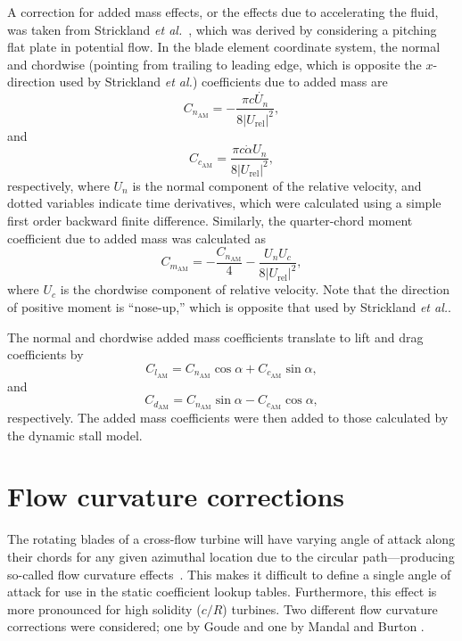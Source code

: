 A correction for added mass effects, or the effects due to accelerating the
fluid, was taken from Strickland \emph{et al.}~\cite{Strickland1981}, which was
derived by considering a pitching flat plate in potential flow. In the blade
element coordinate system, the normal and chordwise (pointing from trailing to
leading edge, which is opposite the $x$-direction used by Strickland \emph{et
    al.}) coefficients due to added mass are
\begin{equation}
    C_{n_\mathrm{AM}} = -\frac{\pi c \dot{U_n}}{8 | U_\mathrm{rel} |^2}, 
\end{equation}
and
\begin{equation}
    C_{c_\mathrm{AM}} = \frac{\pi c \dot{\alpha} U_n }{8 | U_\mathrm{rel} |^2}, 
\end{equation}
respectively, where $U_n$ is the normal component of the relative velocity, and
dotted variables indicate time derivatives, which were calculated using a simple
first order backward finite difference. Similarly, the quarter-chord moment
coefficient due to added mass was calculated as
\begin{equation}
    C_{m_\mathrm{AM}} = -\frac{C_{n_\mathrm{AM}}}{4} 
        - \frac{U_n U_c}{8 | U_\mathrm{rel} |^2},
\end{equation}
where $U_c$ is the chordwise component of relative velocity. Note that the
direction of positive moment is ``nose-up,'' which is opposite that used by
Strickland \emph{et al.}.

The normal and chordwise added mass coefficients translate to lift and drag
coefficients by
\begin{equation}
    C_{l_\mathrm{AM}} = C_{n_\mathrm{AM}} \cos \alpha + C_{c_\mathrm{AM}} \sin
    \alpha,
\end{equation}
and
\begin{equation}
    C_{d_\mathrm{AM}} = C_{n_\mathrm{AM}} \sin \alpha - C_{c_\mathrm{AM}} \cos
    \alpha,
\end{equation}
respectively. The added mass coefficients were then added to those calculated by
the dynamic stall model.


\section{Flow curvature corrections}

The rotating blades of a cross-flow turbine will have varying angle of attack
along their chords for any given azimuthal location due to the circular
path---producing so-called flow curvature effects~\cite{Migliore1980}. This
makes it difficult to define a single angle of attack for use in the static
coefficient lookup tables. Furthermore, this effect is more pronounced for high
solidity ($c/R$) turbines. Two different flow curvature corrections were
considered; one by Goude \cite{Goude2012} and one by Mandal and Burton
\cite{Mandal1994}.

